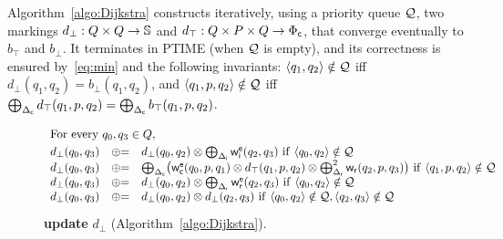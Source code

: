 Algorithm~\ref{algo:Dijkstra} constructs iteratively, using a priority queue $\mathcal{Q}$, 
two markings
$d_\bot : Q \times Q \to \mathbb{S}$ and
$d_\top : Q \times P \times Q \to {\Phi_\mathsf{c}}$,
that converge eventually to $b_\top$ and $b_\bot$. 
%
%
%
%
It terminates in PTIME (when $\mathcal{Q}$ is empty), 
and its correctness is ensured by~\eqref{eq:min} and  
the following invariants: 
$\< q_1, q_2> \notin \Q$ iff $d_\bot(q_1, q_2) = b_\bot(q_1, q_2)$, 
and $\< q_1, p, q_2> \notin \Q$ iff 
$\bigoplus_{{\Delta_\mathsf{c}}} d_\top(q_1, p, q_2) = \bigoplus_{{\Delta_\mathsf{c}}} b_\top(q_1, p, q_2)$.

\begin{figure}[ht]
\(
\begin{array}{lcl}
\multicolumn{3}{l}{%
 \mbox{For~every}\  q_0, q_3 \in Q,}\\[1mm] %
%
d_\bot(q_0, q_3) & \opluseq &
  d_\bot(q_0, q_2) \otimes
  \bigoplus_{\Deltai} \weiei(q_2, q_3)\ 
  \mathrm{if~} \< q_0, q_2> \notin \Q \\
%
d_\bot(q_0, q_3) & \opluseq &
  {\bigoplus_{\Deltac}}
  \bigl(
  \weiec(q_0, p, q_1) \otimes
   d_\top(q_1, p, q_2) \otimes
  \bigoplus^2_{\Deltar} \weir(q_2, p, q_3)\bigr)\ 
  \mathrm{if~} \< q_1, p, q_2> \notin \Q \\
%
d_\bot(q_0, q_3) & \opluseq &
  d_\bot(q_0, q_2) \otimes
  \bigoplus_{\Deltar} \weier(q_2, q_3)\ 
  \mathrm{if~} \< q_0, q_2> \notin \Q \\ 
%
d_\bot(q_0, q_3) & \opluseq &
  d_\bot(q_0, q_2) \otimes d_\bot(q_2, q_3)\  
  \mathrm{if~} \< q_0, q_2>\notin \Q, \< q_2, q_3> \notin \Q \\[-1mm]
\end{array}
\)
\caption{\textbf{update} $d_\bot$ (Algorithm~\ref{algo:Dijkstra}).}
\label{fig:best-update-bottom}
\end{figure}
%

